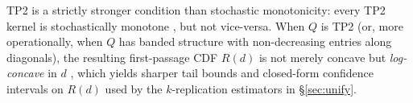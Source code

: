 \begin{remark}
TP2 is a strictly stronger condition than stochastic monotonicity:
every TP2 kernel is stochastically monotone \cite{karlin1968tp}, but
not vice-versa. When $Q$ is TP2 (or, more operationally, when
$Q$ has banded structure with non-decreasing entries along
diagonals), the resulting first-passage CDF $R(d)$ is not merely
concave but \emph{log-concave} in $d$ \cite{karlin1980tp2}, which
yields sharper tail bounds and closed-form confidence intervals on
$R(d)$ used by the $k$-replication estimators in \S\ref{sec:unify}.
\end{remark}
\fi
